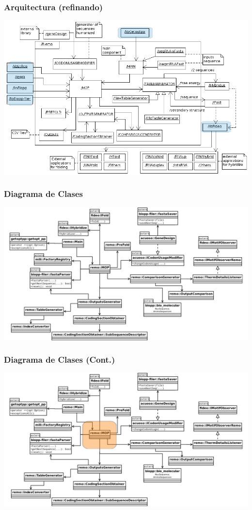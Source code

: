       \begin{frame}\frametitle{\textbf{Arquitectura (refinando)}}
        \includegraphics[scale=.35]{images/arquitectura.png}
      \end{frame}  

      \begin{frame}\frametitle{\textbf{Diagrama de Clases}}
        \begin{center}
          \includegraphics[scale=.25]{images/emptyClass.png}
        \end{center}
      \end{frame}  

      \begin{frame}\frametitle{\textbf{Diagrama de Clases (Cont.)}}
        \begin{center}
          \includegraphics[scale=.25]{images/emptyClass2.png}
        \end{center}
      \end{frame}  


